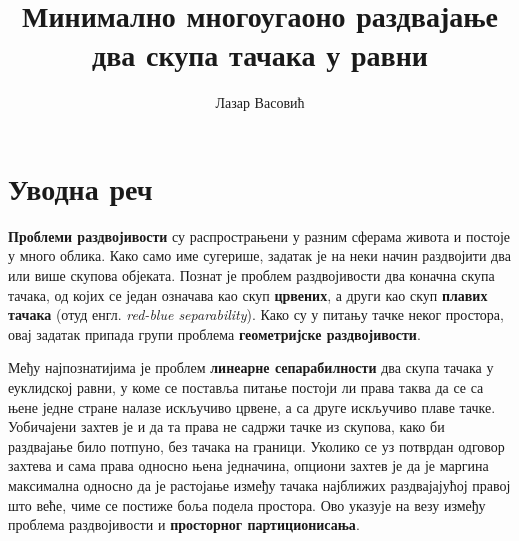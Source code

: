 \documentclass[a4paper]{article}
\begin{document}
\title{Минимално многоугаоно раздвајање два скупа тачака у равни}

\author{Лазар Васовић}

\maketitle


\tableofcontents

\newpage

\section{Уводна реч}

\textbf{Проблеми раздвојивости} су распрострањени у разним сферама живота и постоје у много облика. Како само име сугерише, задатак је на неки начин раздвојити два или више скупова објеката. Познат је проблем раздвојивости два коначна скупа тачака, од којих се један означава као скуп \textbf{црвених}, а други као скуп \textbf{плавих тачака} (отуд енгл. \textit{red-blue separability}). Како су у питању тачке неког простора, овај задатак припада групи проблема \textbf{геометријске раздвојивости}. 

Међу најпознатијима је проблем \textbf{линеарне сепарабилности} два скупа тачака у еуклидској равни, у коме се поставља питање постоји ли права таква да се са њене једне стране налазе искључиво црвене, а са друге искључиво плаве тачке. Уобичајени захтев је и да та права не садржи тачке из скупова, како би раздвајање било потпуно, без тачака на граници. Уколико се уз потврдан одговор захтева и сама права односно њена једначина, опциони захтев је да је маргина максимална односно да је растојање између тачака најближих раздвајајућој правој што веће, чиме се постиже боља подела простора. Ово указује на везу између проблема раздвојивости и \textbf{просторног партиционисања}.
\end{document}
